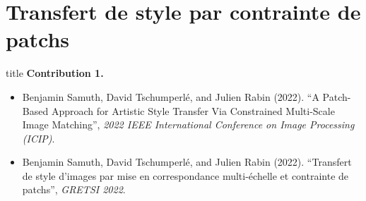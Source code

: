 \documentclass[aspectratio=169, 22pt]{beamer}
\begin{document}
\section{Transfert de style par contrainte de patchs}
\begin{frame}
  \vfill
  \begin{beamercolorbox}[sep=15pt,center,shadow=true,rounded=true]{title}
    \LARGE\bfseries Contribution 1.\\ \secname
  \end{beamercolorbox}
  \vfill
  \begin{itemize}
  \item \footnotesize Benjamin Samuth, David
    Tschumperlé, and Julien Rabin (2022). ``A Patch-Based Approach for
    Artistic Style Transfer Via Constrained Multi-Scale Image
    Matching'', \emph{2022 IEEE International Conference on Image
      Processing (ICIP)}.
  \item \footnotesize Benjamin Samuth, David Tschumperlé, and Julien Rabin (2022).
    ``Transfert de style d’images par mise en correspondance multi-échelle et
    contrainte de patchs'', \emph{GRETSI 2022}.
  \end{itemize}
\end{frame}
\end{document}
